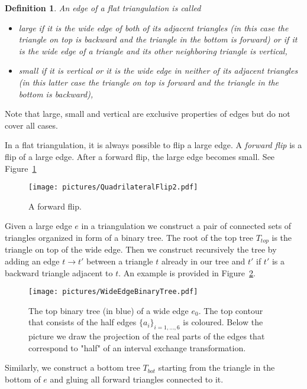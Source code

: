 \documentclass{article}
\newtheorem{definition}{Definition}
\begin{document}
\begin{definition}
An edge of a flat triangulation is called
\begin{itemize}
\item \emph{large} if it is the wide edge of both of its adjacent triangles (in this case
the triangle on top is backward and the triangle in the bottom is forward) or if it is the
wide edge of a triangle and its other neighboring triangle is vertical,
\item \emph{small} if it is vertical or it is the wide edge in neither of its adjacent triangles (in this latter case the triangle on top is forward and the triangle in the bottom is backward),
\end{itemize}
\end{definition}
Note that large, small and vertical are exclusive properties of edges but do
not cover all cases.

In a flat triangulation, it is always possible to flip a large edge. A
\emph{forward flip} is a flip of a large edge. After a forward flip, the large
edge becomes small. See Figure~\ref{fig:ForwardFlip}
\begin{figure}[!ht]
\begin{center}\texttt{[image: pictures/QuadrilateralFlip2.pdf]}\end{center}
\caption{A forward flip.}
\label{fig:ForwardFlip}
\end{figure}



Given a large edge $e$ in a triangulation we construct a pair of connected sets
of triangles organized in form of a binary tree. The root of the top tree
$T_{top}$ is the triangle on top of the wide edge. Then we construct
recursively the tree by adding an edge $t \to t'$ between a triangle $t$
already in our tree and $t'$ if $t'$ is a backward triangle adjacent to $t$.
An example is provided in Figure~\ref{fig:TopTree}.
\begin{figure}[!ht]
\begin{center}\texttt{[image: pictures/WideEdgeBinaryTree.pdf]}\end{center}
\caption{The top binary tree (in blue) of a wide edge $e_0$. The top contour that consists
of the half edges $\{a_i\}_{i=1,\ldots,6}$ is coloured. Below the picture we draw the
projection of the real parts of the edges that correspond to "half" of an interval
exchange transformation.}
\label{fig:TopTree}
\end{figure}
Similarly, we construct a bottom tree $T_{bot}$ starting from the
triangle in the bottom of $e$ and gluing all forward triangles connected
to it.
\end{document}
